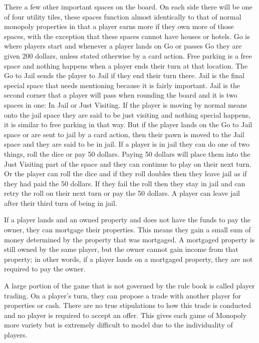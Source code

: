 \documentclass{article}
\begin{document}
There a few other important spaces on the board.  On each side there will be one of four utility tiles, these spaces function almost identically to that of normal monopoly properties in that a player earns more if they own more of those spaces, with the exception that these spaces cannot have houses or hotels.  Go is where players start and whenever a player lands on Go or passes Go they are given 200 dollars, unless stated otherwise by a card action.  Free parking is a free space and nothing happens when a player ends their turn at that location.  The Go to Jail sends the player to Jail if they end their turn there.  Jail is the final special space that needs mentioning because it is fairly important.  Jail is the second corner that a player will pass when rounding the board and it is two spaces in one: In Jail or Just Visiting.  If the player is moving by normal means onto the jail space they are said to be just visiting and nothing special happens, it is similar to free parking in that way. But if the player lands on the Go to Jail space or are sent to jail by a card action, then their pawn is moved to the Jail space and they are said to be in jail.  If a player is in jail they can do one of two things, roll the dice or pay 50 dollars.  Paying 50 dollars will place them into the Just Visiting part of the space and they can continue to play on their next turn.  Or the player can roll the dice and if they roll doubles then they leave jail as if they had paid the 50 dollars.  If they fail the roll then they stay in jail and can retry the roll on their next turn or pay the 50 dollars.  A player can leave jail after their third turn of being in jail.
	
If a player lands and an owned property and does not have the funds to pay the owner, they can mortgage their properties.  This means they gain a small sum of money determined by the property that was mortgaged.  A mortgaged property is still owned by the same player, but the owner cannot gain income from that property; in other words, if a player lands on a mortgaged property, they are not required to pay the owner.

A large portion of the game that is not governed by the rule book is called player trading.  On a player’s turn, they can propose a trade with another player for properties or cash.  There are no true stipulations to how this trade is conducted and no player is required to accept an offer.  This gives each game of Monopoly more variety but is extremely difficult to model due to the individuality of players.
\end{document}
